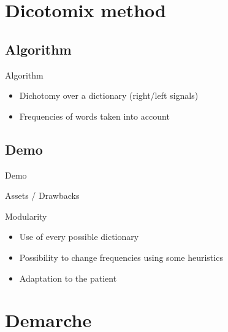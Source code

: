 \documentclass[notes]{beamer}
\begin{document}
\section{Dicotomix method}
\subsection{Algorithm}
\begin{frame}{Algorithm}
	\begin{center}
		\begin{itemize}
			\item Dichotomy over a dictionary (right/left signals)
			\item Frequencies of words taken into account
		\end{itemize}
	\end{center}
\end{frame}

\subsection{Demo}
\begin{frame}{Demo}
	\begin{center}
	\end{center}
\end{frame}

\begin{frame}{Assets / Drawbacks}
	\begin{tcolorbox}[colback=green!5,colframe=green!40!black,title=A nice heading]
		
	\end{tcolorbox}
\end{frame}

\begin{frame}{Modularity}
	\begin{center}
		\begin{itemize}
			\item Use of every possible dictionary %
			\item Possibility to change frequencies using some heuristics
			\item Adaptation to the patient
		\end{itemize}
	\end{center}
\end{frame}

\section{Demarche}
\end{document}
